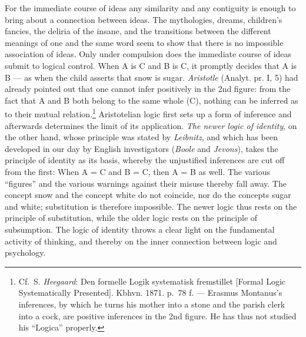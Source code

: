 \documentclass[12pt,a4paper]{book}
\newcommand{\opage}[1]{\marginnote{\footnotesize\textit{[#1]}}}
\begin{document}
For the immediate course of ideas any similarity and any contiguity is
enough to bring about a connection between ideas. The mythologies,
dreams, children's fancies, the deliria of the insane, and the
transitions between the different meanings of one and the same word
seem to show that there is no impossible association of ideas. Only
under compulsion does the immediate course of ideas submit to logical
control. When A is C and B is C, it promptly decides that A is B --- as
when the child asserts that snow is sugar. \emph{Aristotle} (Analyt. pr.
I, 5) had already pointed out that one cannot infer positively in the
2nd figure: from the fact that A and B both belong to the same whole
(C), nothing can be inferred as to their mutual relation.\footnote{Cf.\
S. \emph{Heegaard}: Den formelle Logik systematisk fremstillet [Formal
Logic Systematically Presented]. Kbhvn. 1871. p.~78 f. --- Erasmus
Montanus's inferences, by which he turns his mother into a stone and the
parish clerk into a cock, are positive inferences in the 2nd figure. He
has thus not studied his ``Logica'' properly.} Aristotelian logic first
sets up a form of inference and afterwards determines the limit of its
application. \emph{The newer logic of identity}, on the other hand,
whose principle was stated by \emph{Leibnitz}, and which has been
developed in our day by English investigators (\emph{Boole} and
\emph{Jevons}), takes the principle of identity as its basis, whereby
the unjustified inferences are cut off from the first: When A = C and
B = C, then A = B as well. The various ``figures'' and the various
warnings against their misuse thereby fall away. The concept snow and
the concept white do not coincide, nor do the concepts sugar and white;
substitution is therefore impossible. The newer logic thus rests on the
principle of substitution, while the older logic rests on the principle
of subsumption. The logic of identity
\opage{218}throws a clear light on the fundamental activity of thinking,
and thereby on the inner connection between logic and psychology.
\end{document}
